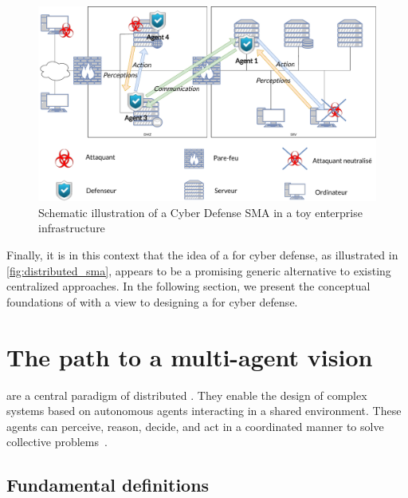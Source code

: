 \begin{figure}[h]
  \centering
  \includegraphics[width=\linewidth]{figures/infra_MAS_illustration.pdf}
  \caption{Schematic illustration of a Cyber Defense SMA in a toy enterprise infrastructure}
  \label{fig:distributed_sma}
\end{figure}

\noindent
Finally, it is in this context that the idea of a  for cyber defense, as illustrated in \autoref{fig:distributed_sma}, appears to be a promising generic alternative to existing centralized approaches. In the following section, we present the conceptual foundations of  with a view to designing a  for cyber defense.

\section{The path to a multi-agent vision}\label {sec:sma-concepts}

 are a central paradigm of distributed . They enable the design of complex systems based on autonomous agents interacting in a shared environment. These agents can perceive, reason, decide, and act in a coordinated manner to solve collective problems~\cite{Ferber1999,Wooldridge2002}.

\subsection* {Fundamental definitions}

